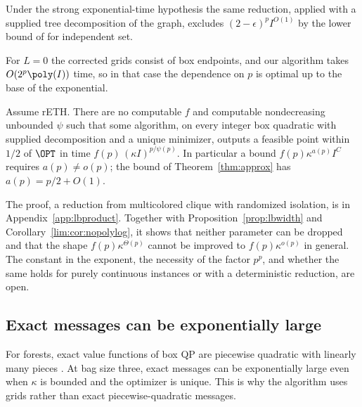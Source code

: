 Under the strong exponential-time hypothesis the same reduction, applied with
a supplied tree decomposition of the graph, excludes $(2-\epsilon)^pI^{O(1)}$
by the lower bound of \cite{LokshtanovMarxSaurabh2018} for independent set.

For $L=0$ the corrected grids consist of box endpoints, and our algorithm takes
$O(2^p\poly(I))$ time, so in that case the dependence on $p$ is optimal up to the
base of the exponential.

\begin{proposition}
\label{prop:lbproduct}
Assume rETH. There are no computable $f$ and computable nondecreasing
unbounded $\psi$ such that some algorithm, on every integer box quadratic with
supplied decomposition and a unique minimizer, outputs a feasible point within
$1/2$ of $\OPT$ in time $f(p)\,(\kappa I)^{p/\psi(p)}$. In particular a bound
$f(p)\kappa^{a(p)}I^{C}$ requires $a(p)\ne o(p)$; the bound of
Theorem~\ref{thm:approx} has $a(p)=p/2+O(1)$.
\end{proposition}

The proof, a reduction from multicolored clique with randomized isolation,
is in Appendix~\ref{app:lbproduct}. Together with
Proposition~\ref{prop:lbwidth} and Corollary~\ref{lim:cor:nopolylog}, it shows
that neither parameter can be dropped and that the shape $f(p)\kappa^{\Theta(p)}$
cannot be improved to $f(p)\kappa^{o(p)}$ in general. The constant in the
exponent, the necessity of the factor $p^p$, and whether the same holds for
purely continuous instances or with a deterministic reduction, are open.


\subsection{Exact messages can be exponentially large}
\label{sec:limits-messages}

For forests, exact value functions of box QP are piecewise quadratic with
linearly many pieces \cite{DelPiaKhajavirad2026}. At bag size three, exact
messages can be exponentially large even when $\kappa$ is bounded and the
optimizer is unique. This is why the algorithm uses grids rather than exact
piecewise-quadratic messages.

